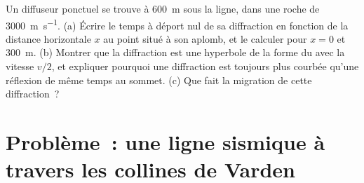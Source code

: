 \begin{exercise}[$\star\star\star$]\label{exo:b3:exploration-seismology:12}
Un diffuseur ponctuel se trouve à \qty{600}{m} sous la ligne, dans une roche de
\qty{3000}{m.s^{-1}}. (a) Écrire le temps à déport nul de sa diffraction en fonction de
la distance horizontale $x$ au point situé à son aplomb, et le calculer pour $x = 0$
et \qty{300}{m}. (b) Montrer que la diffraction est une hyperbole de la forme du 
avec la vitesse $v/2$, et expliquer pourquoi une diffraction est toujours plus courbée qu'une
réflexion de même temps au sommet. (c) Que fait la migration de cette diffraction~?
\end{exercise}

\section{Problème~: une ligne sismique à travers les collines de Varden}

